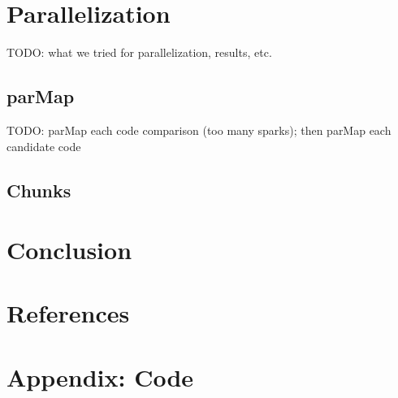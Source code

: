 \documentclass{article}
\begin{document}
\section{Parallelization}
TODO: what we tried for parallelization, results, etc.
\subsection{parMap}
TODO: parMap each code comparison (too many sparks); then parMap each candidate code
\subsection{Chunks}

\section{Conclusion}

\section{References}

\section{Appendix: Code}
\end{document}
